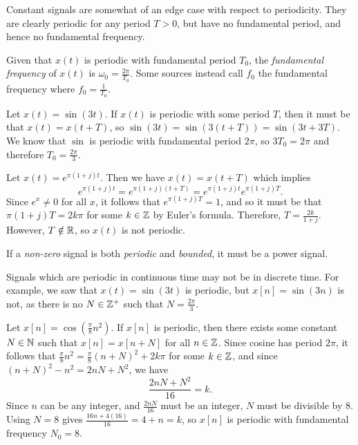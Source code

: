 \begin{rmk}
    Constant signals are somewhat of an edge case with respect to periodicity. They are clearly periodic for any period $T > 0$, but have no fundamental period, and hence no fundamental frequency.
\end{rmk}

\begin{defn}
    Given that $x(t)$ is periodic with fundamental period $T_0$, the \emph{fundamental frequency} of $x(t)$ is $\omega_0 = \frac{2\pi}{T_0}$. Some sources instead call $f_0$ the fundamental frequency where $f_0 = \frac{1}{T_0}$.
\end{defn}

\begin{exmp}
    Let $x(t) = \sin(3t)$. If $x(t)$ is periodic with some period $T$, then it must be that $x(t) = x(t + T)$, so $\sin(3t) = \sin(3(t + T)) = \sin(3t + 3T)$. We know that $\sin$ is periodic with fundamental period $2\pi$, so $3T_0 = 2\pi$ and therefore $T_0 = \frac{2\pi}{3}$.
\end{exmp}

\begin{exmp}
    Let $x(t) = e^{\pi(1 + j)t}$. Then we have $x(t) = x(t + T)$ which implies \[e^{\pi(1 + j)t} = e^{\pi(1 + j)(t + T)} = e^{\pi(1 + j)t}e^{\pi(1 + j)T}.\] Since $e^x \neq 0$ for all $x$, it follows that $e^{\pi(1 + j)T} = 1$, and so it must be that $\pi(1 + j)T = 2k{\pi}$ for some $k \in \mathbb{Z}$ by Euler's formula. Therefore, $T = \frac{2k}{1 + j}$. However, $T \notin \mathbb{R}$, so $x(t)$ is not periodic.
\end{exmp}

\begin{rmk}
    If a \emph{non-zero} signal is both \emph{periodic} and \emph{bounded}, it must be a power signal.
\end{rmk}

\begin{rmk}
    Signals which are periodic in continuous time may not be in discrete time. For example, we saw that $x(t) = \sin(3t)$ is periodic, but $x[n] = \sin(3n)$ is not, as there is no $N \in \mathbb{Z}^+$ such that $N = \frac{2\pi}{3}$.
\end{rmk}

\begin{exmp}
    Let $x[n] = \cos(\frac{\pi}{8}n^2)$. If $x[n]$ is periodic, then there exists some constant $N \in \mathbb{N}$ such that $x[n] = x[n+N]$ for all $n \in \mathbb{Z}$. Since cosine has period $2\pi$, it follows that
    $\frac{\pi}{8}n^2 = \frac{\pi}{8}(n+N)^2 + 2k\pi$ for some $k \in \mathbb{Z}$, and since $(n+N)^2 - n^2 = 2nN + N^2$, we have \[\frac{2nN+N^2}{16} = k.\] Since $n$ can be any integer, and $\frac{2nN}{16}$ must be an integer, $N$ must be divisible by $8$. Using $N = 8$ gives $\frac{16n + 4(16)}{16} = 4 + n = k$, so $x[n]$ is periodic with fundamental frequency $N_0 = 8$.
\end{exmp}

